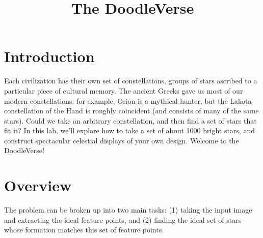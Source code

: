 \documentclass[paper=a4, fontsize=11pt]{scrartcl} %
\title{
\normalfont \normalsize
\huge The DoodleVerse \\ %
}
\date{}
\begin{document}
\maketitle

\begin{figure}[!h]
\captionsetup{labelformat=empty}
\caption{}
\end{figure}

\section{Introduction}

Each civilization has their own set of constellations, groups of stars ascribed to a particular piece of cultural
memory. The ancient Greeks gave us most of our modern constellations: for example, Orion is a mythical
hunter, but the Lakota constellation of the Hand is roughly coincident (and consists of many of the same
stars). Could we take an arbitrary constellation, and then find a set of stars that fit it? In this lab, we’ll
explore how to take a set of about 1000 bright stars, and construct spectacular celestial displays of your own
design. Welcome to the DoodleVerse!

\section{Overview}

The problem can be broken up into two main tasks: (1) taking the input image and extracting the ideal feature points, and (2) finding the ideal set of stars whose formation matches this set of feature points.
\end{document}
